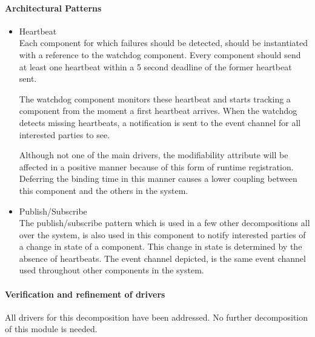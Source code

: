 \paragraph{Architectural Patterns}
\begin{itemize}
	\item{Heartbeat}\\
	Each component for which failures should be detected, should be instantiated with a reference to the watchdog component.
Every component should send at least one heartbeat within a 5 second deadline of the former heartbeat sent. 

The watchdog component monitors these heartbeat and starts tracking a component from the moment a first heartbeat arrives. When the watchdog detects missing heartbeats, a notification is sent to the event channel for all interested parties to see.

Although not one of the main drivers, the modifiability attribute will be affected in a positive manner because of this form of runtime registration. 
Deferring the binding time in this manner causes a lower coupling between this component and the others in the system.
	\item{Publish/Subscribe} \\
	The publish/subscribe pattern which is used in a few other decompositions all over the system, is also used in this component to notify interested parties of a change in state of a component. This change in state is determined by the absence of heartbeats. The event channel depicted, is the same event channel used throughout other components in the system.
\end{itemize}


\paragraph{Verification and refinement of drivers}
All drivers for this decomposition have been addressed. No further decomposition of this module is needed.

